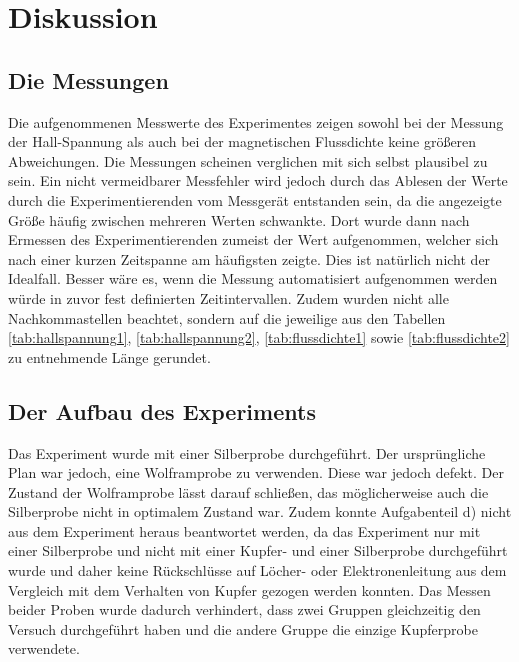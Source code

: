 \section{Diskussion}
\subsection{Die Messungen}
  Die aufgenommenen Messwerte des Experimentes zeigen sowohl bei der Messung der Hall-Spannung als auch
  bei der magnetischen Flussdichte keine größeren Abweichungen. Die Messungen scheinen verglichen mit sich selbst
  plausibel zu sein. Ein nicht vermeidbarer Messfehler wird jedoch durch das Ablesen der Werte durch
  die Experimentierenden vom Messgerät entstanden sein, da die angezeigte Größe häufig zwischen mehreren Werten schwankte. Dort wurde
  dann nach Ermessen des Experimentierenden zumeist der Wert aufgenommen, welcher sich nach einer kurzen Zeitspanne am
  häufigsten zeigte. Dies ist natürlich nicht der Idealfall. Besser wäre es, wenn die Messung automatisiert aufgenommen
  werden würde in zuvor fest definierten Zeitintervallen. Zudem wurden nicht alle Nachkommastellen beachtet, sondern auf
  die jeweilige aus den Tabellen \ref{tab:hallspannung1}, \ref{tab:hallspannung2}, \ref{tab:flussdichte1} sowie
  \ref{tab:flussdichte2} zu entnehmende Länge gerundet.
\subsection{Der Aufbau des Experiments}
  Das Experiment wurde mit einer Silberprobe durchgeführt. Der ursprüngliche Plan war jedoch, eine Wolframprobe zu
  verwenden. Diese war jedoch defekt. Der Zustand der Wolframprobe lässt darauf schließen, das möglicherweise auch die
  Silberprobe nicht in optimalem Zustand war. Zudem konnte Aufgabenteil d) nicht aus dem Experiment heraus beantwortet
  werden, da das Experiment nur mit einer Silberprobe und nicht mit einer Kupfer- und einer Silberprobe durchgeführt
  wurde und daher keine Rückschlüsse auf Löcher- oder Elektronenleitung aus dem Vergleich mit dem Verhalten von Kupfer
  gezogen werden konnten. Das Messen beider Proben wurde dadurch verhindert, dass zwei Gruppen gleichzeitig den Versuch durchgeführt haben
  und die andere Gruppe die einzige Kupferprobe verwendete.
\label{sec:Diskussion}

